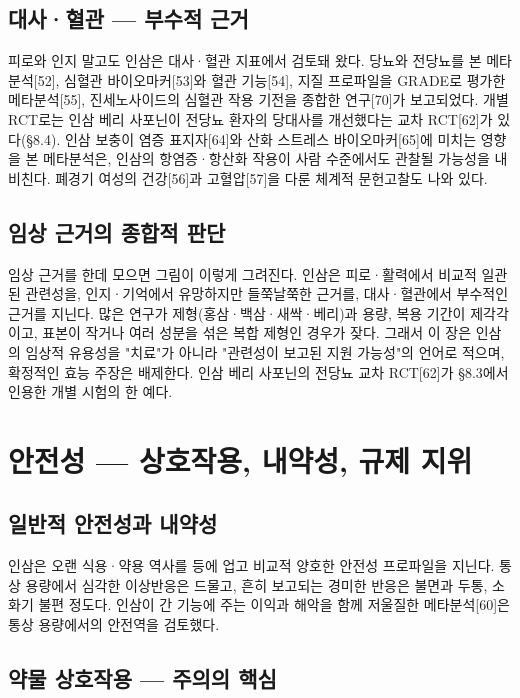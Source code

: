 \documentclass[12pt,oneside]{book}
\begin{document}
\subsection{대사·혈관 — 부수적 근거}

피로와 인지 말고도 인삼은 대사·혈관 지표에서 검토돼 왔다. 당뇨와 전당뇨를 본 메타분석[52], 심혈관 바이오마커[53]와 혈관 기능[54], 지질 프로파일을 GRADE로 평가한 메타분석[55], 진세노사이드의 심혈관 작용 기전을 종합한 연구[70]가 보고되었다. 개별 RCT로는 인삼 베리 사포닌이 전당뇨 환자의 당대사를 개선했다는 교차 RCT[62]가 있다(§8.4). 인삼 보충이 염증 표지자[64]와 산화 스트레스 바이오마커[65]에 미치는 영향을 본 메타분석은, 인삼의 항염증·항산화 작용이 사람 수준에서도 관찰될 가능성을 내비친다. 폐경기 여성의 건강[56]과 고혈압[57]을 다룬 체계적 문헌고찰도 나와 있다.

\subsection{임상 근거의 종합적 판단}

임상 근거를 한데 모으면 그림이 이렇게 그려진다. 인삼은 피로·활력에서 비교적 일관된 관련성을, 인지·기억에서 유망하지만 들쭉날쭉한 근거를, 대사·혈관에서 부수적인 근거를 지닌다. 많은 연구가 제형(홍삼·백삼·새싹·베리)과 용량, 복용 기간이 제각각이고, 표본이 작거나 여러 성분을 섞은 복합 제형인 경우가 잦다. 그래서 이 장은 인삼의 임상적 유용성을 "치료"가 아니라 "관련성이 보고된 지원 가능성"의 언어로 적으며, 확정적인 효능 주장은 배제한다. 인삼 베리 사포닌의 전당뇨 교차 RCT[62]가 §8.3에서 인용한 개별 시험의 한 예다.

\section{안전성 — 상호작용, 내약성, 규제 지위}

\subsection{일반적 안전성과 내약성}

인삼은 오랜 식용·약용 역사를 등에 업고 비교적 양호한 안전성 프로파일을 지닌다. 통상 용량에서 심각한 이상반응은 드물고, 흔히 보고되는 경미한 반응은 불면과 두통, 소화기 불편 정도다. 인삼이 간 기능에 주는 이익과 해악을 함께 저울질한 메타분석[60]은 통상 용량에서의 안전역을 검토했다.

\subsection{약물 상호작용 — 주의의 핵심}
\end{document}

